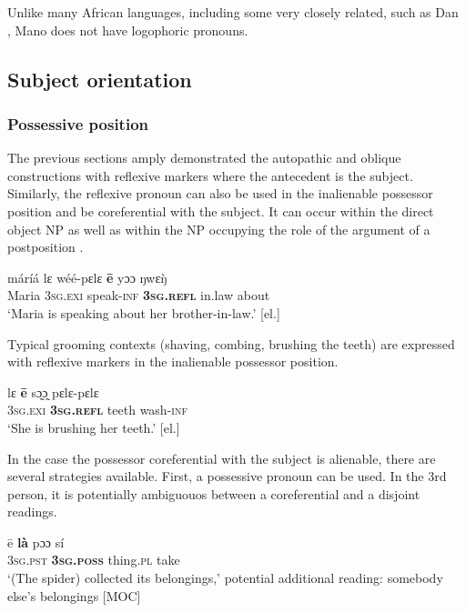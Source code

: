 \documentclass[output=paper]{langscibook}
\begin{document}
Unlike many African languages, including some very closely related, such as Dan \citep{Vydrin2017}, Mano does not have logophoric pronouns.


 
 \subsection{Subject orientation}\label{sec:Kachaturyan:5.2}

 \subsubsection{Possessive position}\label{sec:Kachaturyan:5.2.1}


The previous sections amply demonstrated the autopathic and oblique constructions with reflexive markers where the antecedent is the subject. Similarly, the reflexive pronoun can also be used in the inalienable possessor position and be coreferential with the subject. It can occur within the direct object NP  as well as within the NP occupying the role of the argument of a postposition .

\ea
    \label{ex:Kachaturyan:21} 
 \gll máríá  lɛ  wéé-pɛlɛ  \textbf{ē}  yɔɔ  ŋwɛ\`{ŋ}\\
     Maria  \textsc{3sg.exi}  speak-\textsc{inf}  \textbf{\textsc{3sg.refl}}  in.law  about\\
\glt ‘Maria is speaking about her brother-in-law.’ [el.]\z

Typical grooming contexts (shaving, combing, brushing the teeth) are expressed with reflexive markers in the inalienable possessor position.

\ea
    \label{ex:Kachaturyan:22} 
 \gll lɛ  \textbf{ē}  sɔ̰ɔ̰  pɛlɛ-pɛlɛ\\
     3\textsc{sg.exi}  \textbf{\textsc{3sg.refl}}  teeth  wash-\textsc{inf}\\
\glt ‘She is brushing her teeth.’ [el.]\z

In the case the possessor coreferential with the subject is alienable, there are several strategies available. First, a possessive pronoun can be used. In the 3rd person, it is potentially ambiguouos between a coreferential and a disjoint readings.

\ea
    \label{ex:Kachaturyan:23} 
 \gll ē  \textbf{là}  pɔɔ  sí  \\
     3\textsc{sg.pst}  \textbf{\textsc{3sg.poss}}  thing.\textsc{pl}  take \\
\glt ‘(The spider) collected its belongings,’ potential additional reading: somebody else’s belongings [MOC]\z
\end{document}
